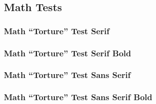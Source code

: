 \documentclass[11pt, a4paper, twoside]{book}
\begin{document}
\begin{refsection}

\chapter{Math Tests}
\label{diss:MathTests}

\begin{abstract}
	This section contains an extensive set of math ``torture'' tests. They are designed to check whether mathematical notation is rendered correctly across a~wide range of cases. The examples include inline formulas, displayed equations, aligned equations, matrices, and other common mathematical structures. The expressions are not meant to make sense, but rather to expose potential formatting problems.
\end{abstract}

\clearpage

{%
	\setlength{\parindent}{0cm}

	

	\renewcommand{\showfamily}{{\color{magenta}%
		Serif%
	}}
	{\rmfamily\mdseries%
	 \subsection{Math ``Torture'' Test \showfamily}
 	}

	\renewcommand{\showfamily}{{\color{magenta}%
		Serif Bold%
	}}
	{\rmfamily\bfseries%
	 \subsection{Math ``Torture'' Test \showfamily}
 	}

	\renewcommand{\showfamily}{{\color{magenta}%
		Sans Serif%
	}}
	{\sffamily\mdseries%
	 \subsection{Math ``Torture'' Test \showfamily}
	}

	\renewcommand{\showfamily}{{\color{magenta}%
		Sans Serif Bold%
	}}
	{\sffamily\bfseries%
	 \subsection{Math ``Torture'' Test \showfamily}
	}
}

\end{refsection}
\end{document}
